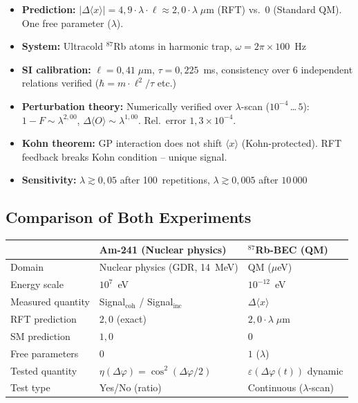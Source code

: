 \documentclass[a4paper,11pt]{article}
\begin{document}
	\begin{itemize}
		\item \textbf{Prediction:}
		$|\Delta\langle x\rangle|
		= 4{,}9 \cdot \lambda \cdot \ell
		\approx 2{,}0 \cdot \lambda\;\mu$m (RFT)
		vs.\ $0$ (Standard QM). One free parameter
		($\lambda$).
		\item \textbf{System:} Ultracold ${}^{87}$Rb atoms
		in harmonic trap,
		$\omega = 2\pi \times 100$~Hz
		\item \textbf{SI calibration:}
		$\ell = 0{,}41\;\mu$m,
		$\tau = 0{,}225$~ms, consistency over 6
		independent relations verified
		($\hbar = m \cdot \ell^2/\tau$ etc.)
		\item \textbf{Perturbation theory:} Numerically
		verified over $\lambda$-scan
		($10^{-4}$\,\ldots\,$5$):
		$1 - F \sim \lambda^{2{,}00}$,
		$\Delta\langle O\rangle \sim \lambda^{1{,}00}$.
		Rel.\ error $1{,}3 \times 10^{-4}$.
		\item \textbf{Kohn theorem:}
		GP interaction does not shift $\langle x\rangle$
		(Kohn-protected). RFT feedback breaks
		Kohn condition -- unique signal.
		\item \textbf{Sensitivity:}
		$\lambda \gtrsim 0{,}05$ after 100~repetitions,
		$\lambda \gtrsim 0{,}005$ after $10\,000$
	\end{itemize}
	
	\subsection{Comparison of Both Experiments}
	
	\begin{center}
		\small
		\begin{tabular}{lll}
			\hline
			& \textbf{Am-241 (Nuclear physics)}
			& \textbf{${}^{87}$Rb-BEC (QM)} \\
			\hline
			Domain & Nuclear physics (GDR, 14~MeV)
			& QM ($\mu$eV) \\
			Energy scale & $10^7$~eV & $10^{-12}$~eV \\
			Measured quantity
			& Signal$_{\mathrm{coh}}$ /
			Signal$_{\mathrm{inc}}$
			& $\Delta\langle x\rangle$ \\
			RFT prediction & $2{,}0$ (exact)
			& $2{,}0 \cdot \lambda\;\mu$m \\
			SM prediction & $1{,}0$ & $0$ \\
			Free parameters & $0$ & $1$ ($\lambda$) \\
			Tested quantity
			& $\eta(\Delta\varphi)
			= \cos^2(\Delta\varphi/2)$
			& $\varepsilon(\Delta\varphi(t))$ dynamic \\
			Test type & Yes/No (ratio)
			& Continuous ($\lambda$-scan) \\
			\hline
		\end{tabular}
	\end{center}
	
\end{document}
